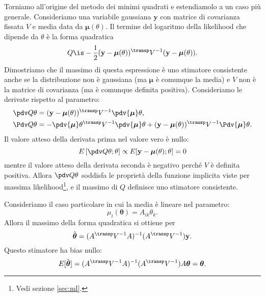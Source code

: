 Torniamo all'origine del metodo dei minimi quadrati e estendiamolo a un caso più generale.
Consideriamo una variabile gaussiana $\mathbf y$ con matrice di covarianza fissata $V$ e media data da $\boldsymbol\mu(\theta)$.
Il termine del logaritmo della likelihood che dipende da $\theta$ è la forma quadratica
\begin{equation*}
	Q \is -\frac 12 (\mathbf y - \boldsymbol\mu(\theta))^\transp V^{-1} (\mathbf y - \boldsymbol\mu(\theta)).
\end{equation*}
Dimostriamo che il massimo di questa espressione è uno stimatore consistente
anche se la distribuzione non è gaussiana (ma $\boldsymbol\mu$ è comunque la media)
e $V$ non è la matrice di covarianza (ma è comunque definita positiva).
Consideriamo le derivate rispetto al parametro:
\begin{align*}
	\pdv Q\theta
	&= (\mathbf y - \boldsymbol\mu(\theta))^\transp V^{-1} \pdv{\boldsymbol\mu}\theta, \\
	\Pdv Q\theta
	&= - \pdv{\boldsymbol\mu}\theta^\transp V^{-1} \pdv{\boldsymbol\mu}\theta
	+ (\mathbf y - \boldsymbol\mu(\theta))^\transp V^{-1} \Pdv{\boldsymbol\mu}\theta.
\end{align*}
Il valore atteso della derivata prima nel valore vero è nullo:
\begin{equation*}
	E\left[\pdv Q\theta;\theta\right]
	\propto E[\mathbf y - \boldsymbol\mu(\theta);\theta] = 0
\end{equation*}
mentre il valore atteso della derivata seconda è negativo perché $V$ è definita positiva.
Allora $\pdv Q\theta$ soddisfa le proprietà della funzione implicita viste per massima likelihood\footnote{Vedi sezione \ref{sec:ml}.},
e il massimo di $Q$ definisce uno stimatore consistente.

Consideriamo il caso particolare in cui la media è lineare nel parametro:
\begin{equation*}
	\mu_i(\boldsymbol\theta) = A_{ik} \theta_k.
\end{equation*}
Allora il massimo della forma quadratica si ottiene per
\begin{equation*}
	\hat{\boldsymbol\theta} = (A^\transp V^{-1} A)^{-1} (A^\transp V^{-1}) \mathbf y.
\end{equation*}
Questo stimatore ha bias nullo:
\begin{equation*}
	E[\hat{\boldsymbol\theta}]
	= (A^\transp V^{-1} A)^{-1} (A^\transp V^{-1}) A \boldsymbol\theta
	= \boldsymbol\theta.
\end{equation*}

